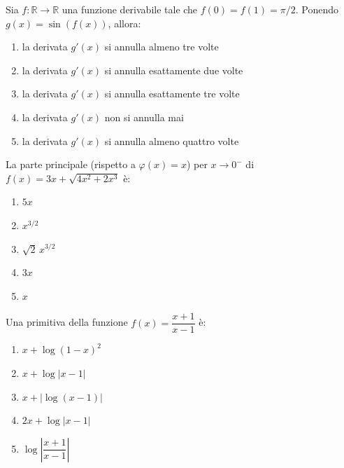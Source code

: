 \begin{quiz}
Sia $f:\mathbb R\to\mathbb R$ una funzione derivabile tale che $f(0)=f(1)=\pi/2$. Ponendo $g(x)=\sin(f(x))$, allora:
\begin{enumerate}
\item la derivata $g\prime(x)$ si annulla almeno tre volte
\item la derivata $g\prime(x)$ si annulla esattamente due volte
\item la derivata $g\prime(x)$ si annulla esattamente tre volte
\item la derivata $g\prime(x)$ non si annulla mai
\item la derivata $g\prime(x)$ si annulla almeno quattro volte
\end{enumerate}
\end{quiz}

\begin{quiz}
La parte principale (rispetto a $\varphi(x)=x$) per $x\to0^-$ di $f(x)=3x+\sqrt{4x^2+2x^3}$ \`e:
\begin{enumerate}
\item $5x$
\item $x^{3/2}$
\item $\sqrt2\,x^{3/2}$
\item $3x$
\item $x$
\end{enumerate}
\end{quiz}

\begin{quiz}
Una primitiva della funzione $f(x)=\dfrac{x+1}{x-1}$ \`e:
\begin{enumerate}
\item $x+\log(1-x)^2$
\item $x+\log|x-1|$
\item $x+|\log(x-1)|$
\item $2x+\log|x-1|$
\item $\log\left|\dfrac{x+1}{x-1}\right|$
\end{enumerate}
\end{quiz}

